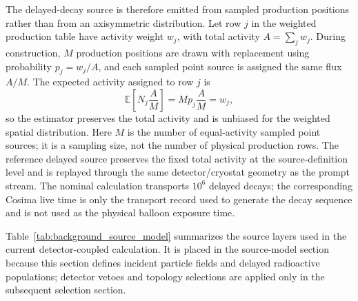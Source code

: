 \documentclass[11pt]{article}
\begin{document}
The delayed-decay source is therefore emitted from sampled production positions
rather than from an axisymmetric distribution. Let row $j$ in the weighted
production table have activity weight $w_j$, with total activity
$A=\sum_j w_j$. During construction, $M$ production positions are drawn with
replacement using probability $p_j=w_j/A$, and each sampled point source is
assigned the same flux $A/M$. The expected activity assigned to row $j$ is
\begin{equation}
  \mathbb{E}\!\left[N_j\frac{A}{M}\right] = M p_j \frac{A}{M} = w_j ,
\end{equation}
so the estimator preserves the total activity and is unbiased for the weighted
spatial distribution. Here $M$ is the number of equal-activity sampled point
sources; it is a sampling size, not the number of physical production rows. The
reference delayed source preserves the fixed total activity at the
source-definition level and is replayed through the same detector/cryostat
geometry as the prompt stream. The nominal calculation transports $10^6$
delayed decays; the corresponding Cosima live time is only the transport record
used to generate the decay sequence and is not used as the physical balloon
exposure time.

Table~\ref{tab:background_source_model} summarizes the source layers used in the
current detector-coupled calculation. It is placed in the source-model section
because this section defines incident particle fields and delayed radioactive
populations; detector vetoes and topology selections are applied only in the
subsequent selection section.
\end{document}
